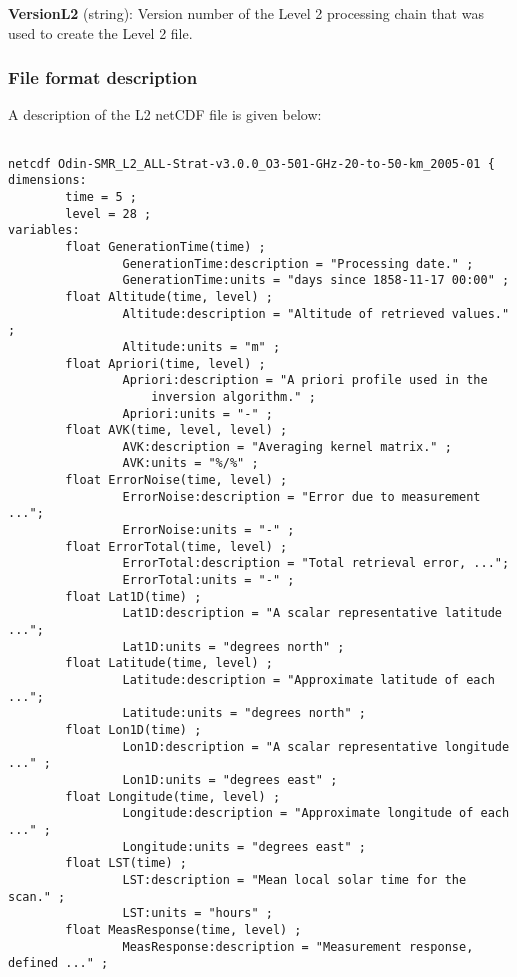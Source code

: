 \textbf{VersionL2} (string): Version number of the Level 2 processing chain that was used to create the Level 2 file. \\


\subsubsection{File format description}

A description of the L2 netCDF file is given below:

\begin{verbatim}

netcdf Odin-SMR_L2_ALL-Strat-v3.0.0_O3-501-GHz-20-to-50-km_2005-01 {
dimensions:
        time = 5 ;
        level = 28 ;
variables:
        float GenerationTime(time) ;
                GenerationTime:description = "Processing date." ;
                GenerationTime:units = "days since 1858-11-17 00:00" ;
        float Altitude(time, level) ;
                Altitude:description = "Altitude of retrieved values." ;
                Altitude:units = "m" ;
        float Apriori(time, level) ;
                Apriori:description = "A priori profile used in the
                    inversion algorithm." ;
                Apriori:units = "-" ;
        float AVK(time, level, level) ;
                AVK:description = "Averaging kernel matrix." ;
                AVK:units = "%/%" ;
        float ErrorNoise(time, level) ;
                ErrorNoise:description = "Error due to measurement ...";
                ErrorNoise:units = "-" ;
        float ErrorTotal(time, level) ;
                ErrorTotal:description = "Total retrieval error, ...";
                ErrorTotal:units = "-" ;
        float Lat1D(time) ;
                Lat1D:description = "A scalar representative latitude ...";
                Lat1D:units = "degrees north" ;
        float Latitude(time, level) ;
                Latitude:description = "Approximate latitude of each ...";
                Latitude:units = "degrees north" ;
        float Lon1D(time) ;
                Lon1D:description = "A scalar representative longitude ..." ;
                Lon1D:units = "degrees east" ;
        float Longitude(time, level) ;
                Longitude:description = "Approximate longitude of each ..." ;
                Longitude:units = "degrees east" ;
        float LST(time) ;
                LST:description = "Mean local solar time for the scan." ;
                LST:units = "hours" ;
        float MeasResponse(time, level) ;
                MeasResponse:description = "Measurement response, defined ..." ;

\end{verbatim}
